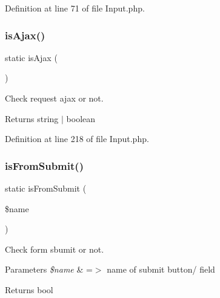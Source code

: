 Definition at line 71 of file Input.\+php.

\mbox{\label{class_zest_1_1_input_1_1_input_a2b266c0de7a87b606b3926baafe483e5}} 
\subsubsection{\texorpdfstring{is\+Ajax()}{isAjax()}}
{\footnotesize\ttfamily static is\+Ajax (\begin{DoxyParamCaption}{ }\end{DoxyParamCaption})\hspace{0.3cm}{\ttfamily [static]}}

Check request ajax or not.

\begin{DoxyReturn}{Returns}
string $\vert$ boolean 
\end{DoxyReturn}


Definition at line 218 of file Input.\+php.

\mbox{\label{class_zest_1_1_input_1_1_input_ae207ff15e4180edd01103a5df5967850}} 
\subsubsection{\texorpdfstring{is\+From\+Submit()}{isFromSubmit()}}
{\footnotesize\ttfamily static is\+From\+Submit (\begin{DoxyParamCaption}\item[{}]{\$name }\end{DoxyParamCaption})\hspace{0.3cm}{\ttfamily [static]}}

Check form sbumit or not.


\begin{DoxyParams}{Parameters}
{\em \$name} & =$>$ name of submit button/ field\\
\hline
\end{DoxyParams}
\begin{DoxyReturn}{Returns}
bool 
\end{DoxyReturn}


